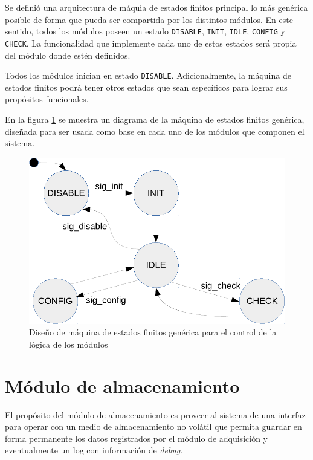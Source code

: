 Se definió una arquitectura de máquia de estados finitos principal lo más genérica posible de forma que pueda ser compartida por los distintos módulos.  En este sentido, todos los módulos poseen un estado \texttt{DISABLE}, \texttt{INIT}, \texttt{IDLE}, \texttt{CONFIG} y \texttt{CHECK}. La funcionalidad que implemente cada uno de estos estados será propia del módulo donde estén definidos. 

Todos los módulos inician en estado \texttt{DISABLE}. Adicionalmente, la máquina de estados finitos podrá tener otros estados que sean específicos para lograr sus propósitos funcionales.

En la figura \ref{fig:mef_generica} se muestra un diagrama de la máquina de estados finitos genérica, diseñada para ser usada como base en cada uno de los módulos que componen el sistema.

\begin{figure}[htpb]
	\centering
	\includegraphics[width=\textwidth]{./Figures/MEF_generica.pdf}
	\caption[Diseño de MEF genérica para los módulos]{Diseño de máquina de estados finitos genérica para el control de la lógica de los módulos}
	\label{fig:mef_generica}
\end{figure}

\section{Módulo de almacenamiento}
\label{sec:almacenamiento}

El propósito del módulo de almacenamiento es proveer al sistema de una interfaz para operar con un medio de almacenamiento no volátil que permita guardar en forma permanente los datos registrados por el módulo de adquisición y eventualmente un log con información de \textit{debug}.  

